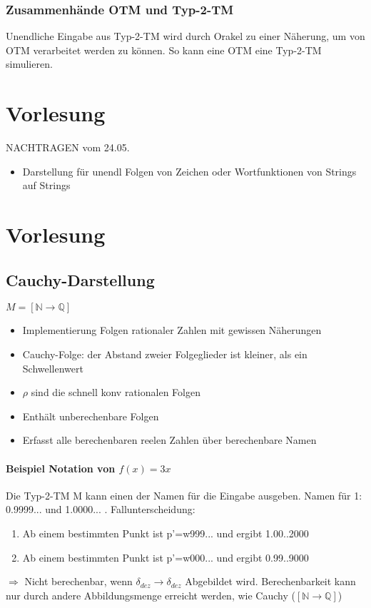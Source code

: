 \documentclass[ngerman]{scrartcl}
\begin{document}
\subsubsection{Zusammenhände OTM und Typ-2-TM}
Unendliche Eingabe aus Typ-2-TM wird durch Orakel zu einer Näherung, um von OTM verarbeitet werden zu können. So kann eine OTM eine Typ-2-TM simulieren.


\section{Vorlesung}
NACHTRAGEN vom 24.05.
\begin{itemize}
  \item Darstellung für unendl Folgen von Zeichen oder Wortfunktionen von Strings auf Strings
\end{itemize}


\section{Vorlesung}
\subsection{Cauchy-Darstellung}
$ M = [ \mathbb{N} \rightarrow \mathbb{Q} ] $
\begin{itemize}
  \item Implementierung Folgen rationaler Zahlen mit gewissen Näherungen
  \item Cauchy-Folge: der Abstand zweier Folgeglieder ist kleiner, als ein Schwellenwert
  \item $ \rho $ sind die schnell konv rationalen Folgen
  \item Enthält unberechenbare Folgen
  \item Erfasst alle berechenbaren reelen Zahlen über berechenbare Namen
\end{itemize}
\paragraph{Beispiel Notation von $ f(x) = 3x $}
Die Typ-2-TM M kann einen der Namen für die Eingabe ausgeben. Namen für 1: 0.9999... und 1.0000... . Fallunterscheidung:
\begin{enumerate}
  \item Ab einem bestimmten Punkt ist p'=w999... und ergibt 1.00..2000
  \item Ab einem bestimmten Punkt ist p'=w000... und ergibt 0.99..9000
\end{enumerate}
$ \Rightarrow $ Nicht berechenbar, wenn $ \delta_{dez} \rightarrow \delta_{dez} $ Abgebildet wird. Berechenbarkeit kann nur durch andere Abbildungsmenge erreicht werden, wie Cauchy ($ [\mathbb{N}\rightarrow\mathbb{Q}]$)
\end{document}
